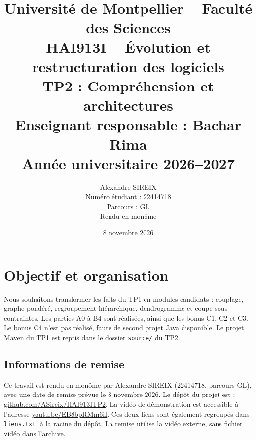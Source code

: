 \documentclass[11pt,a4paper]{article}
\title{Université de Montpellier -- Faculté des Sciences\\[0.5em]
HAI913I -- Évolution et restructuration des logiciels\\[0.5em]
TP2 : Compréhension et architectures\\[0.5em]
\large Enseignant responsable : Bachar Rima\\Année universitaire 2026--2027}
\author{Alexandre SIREIX\\Numéro étudiant : 22414718\\Parcours : GL\\Rendu en monôme}
\date{8 novembre 2026}
\begin{document}
\begin{titlepage}
\maketitle
\thispagestyle{empty}
\end{titlepage}
\tableofcontents
\clearpage
{}

\section{Objectif et organisation}
Nous souhaitons transformer les faits du TP1 en modules candidats : couplage,
graphe pondéré, regroupement hiérarchique, dendrogramme et coupe sous contraintes.
Les parties A0 à B4 sont réalisées, ainsi que les bonus C1, C2 et C3.
Le bonus C4 n'est pas réalisé, faute de second projet Java disponible.
Le projet Maven du TP1 est repris dans le dossier \texttt{source/} du TP2.

\subsection{Informations de remise}
Ce travail est rendu en monôme par Alexandre SIREIX (22414718, parcours GL),
avec une date de remise prévue le 8 novembre 2026.
Le dépôt du projet est :
\href{https://github.com/ASireix/HAI913ITP2}{github.com/ASireix/HAI913ITP2}.
La vidéo de démonstration est accessible à l'adresse
\href{https://youtu.be/EB8bpRMm6iI}{youtu.be/EB8bpRMm6iI}.
Ces deux liens sont également regroupés dans \texttt{liens.txt}, à la racine
du dépôt. La remise utilise la vidéo externe, sans fichier vidéo dans l'archive.
\end{document}
